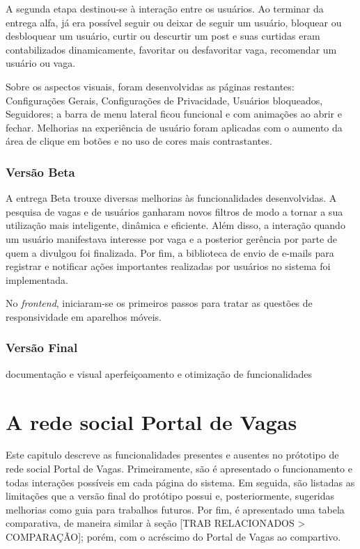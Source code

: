 \documentclass[cic,tc]{iiufrgs}
\begin{document}
A segunda etapa destinou-se à interação entre os usuários. Ao terminar da entrega alfa, já era possível seguir ou deixar de seguir um usuário, bloquear ou desbloquear um usuário, curtir ou descurtir um post e suas curtidas eram contabilizados dinamicamente, favoritar ou desfavoritar vaga, recomendar um usuário ou vaga. 

Sobre os aspectos visuais, foram desenvolvidas as páginas restantes: Configurações Gerais, Configurações de Privacidade, Usuários bloqueados, Seguidores; a barra de menu lateral ficou funcional e com animações ao abrir e fechar. Melhorias na experiência de usuário foram aplicadas com o aumento da área de clique em botões e no uso de cores mais contrastantes.

\subsection{Versão Beta}
\label{implementacaoBR}

A entrega Beta trouxe diversas melhorias às funcionalidades desenvolvidas. A pesquisa de vagas e de usuários ganharam novos filtros de modo a tornar a sua utilização mais inteligente, dinâmica e eficiente. Além disso, a interação quando um usuário manifestava interesse por vaga e a posterior gerência por parte de quem a divulgou foi finalizada. Por fim, a biblioteca de envio de e-mails para registrar e notificar ações importantes realizadas por usuários no sistema foi implementada.

No \textit{frontend}, iniciaram-se os primeiros passos para tratar as questões de responsividade em aparelhos móveis.

\subsection{Versão Final}
\label{implementacaoFR}

documentação e visual
aperfeiçoamento e otimização de funcionalidades


\chapter{A rede social Portal de Vagas}
\label{redeSocialPortal}

Este capitulo descreve as funcionalidades presentes e ausentes no prótotipo de rede social Portal de Vagas. Primeiramente, são é apresentado o funcionamento e todas interações possíveis em cada página do sistema. Em seguida, são listadas as limitações que a versão final do protótipo possui e, posteriormente, sugeridas melhorias como guia para trabalhos futuros. Por fim, é apresentado uma tabela comparativa, de maneira similar à seção [TRAB RELACIONADOS > COMPARAÇÃO]; porém, com o acréscimo do Portal de Vagas ao compartivo.
\end{document}
